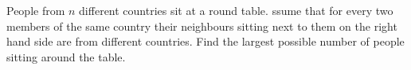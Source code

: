 People from $n$ different countries sit at a round table. 
ssume that for every two members of the same country their neighbours sitting next to them
on the right hand side are from different countries.
Find the largest possible number of people sitting around the table.